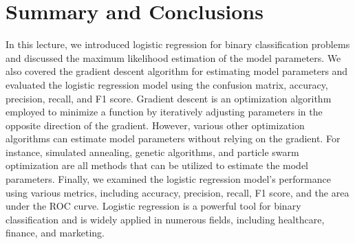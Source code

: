 \documentclass{article}[12pt]
\begin{document}
\section{Summary and Conclusions}
In this lecture, we introduced logistic regression for binary classification problems and discussed the maximum likelihood estimation of the model parameters. We also covered the gradient descent algorithm for estimating model parameters and evaluated the logistic regression model using the confusion matrix, accuracy, precision, recall, and F1 score. Gradient descent is an optimization algorithm employed to minimize a function by iteratively adjusting parameters in the opposite direction of the gradient. However, various other optimization algorithms can estimate model parameters without relying on the gradient. For instance, simulated annealing, genetic algorithms, and particle swarm optimization are all methods that can be utilized to estimate the model parameters. Finally, we examined the logistic regression model's performance using various metrics, including accuracy, precision, recall, F1 score, and the area under the ROC curve. Logistic regression is a powerful tool for binary classification and is widely applied in numerous fields, including healthcare, finance, and marketing.



\end{document}

